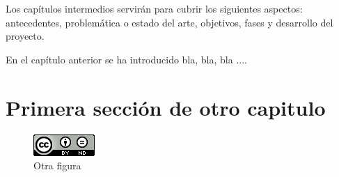 Los capítulos intermedios servirán para cubrir los siguientes aspectos: antecedentes, problemática o estado del arte, objetivos, fases y desarrollo del proyecto.

\bigskip
En el capítulo anterior se ha introducido bla, bla, bla ....

\section{Primera sección de otro capitulo}

\begin{figure}[htb]
   \centering
   \includegraphics[width=0.3\linewidth]{images/by-nd_88x31}
   \caption{Otra figura}
   \label{fig:otroejemplo}
\end{figure}

